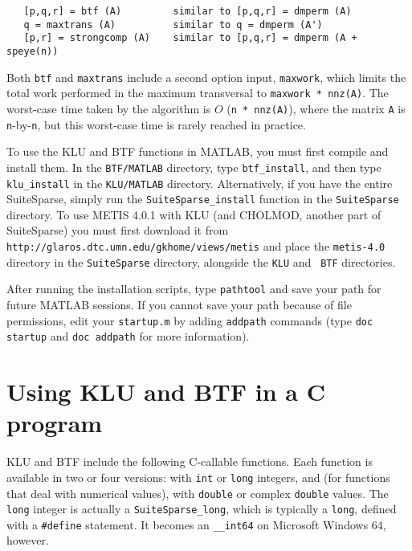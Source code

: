 \documentclass[11pt]{article}
\begin{document}
{\footnotesize
\begin{verbatim}
   [p,q,r] = btf (A)         similar to [p,q,r] = dmperm (A)
   q = maxtrans (A)          similar to q = dmperm (A')
   [p,r] = strongcomp (A)    similar to [p,q,r] = dmperm (A + speye(n))
\end{verbatim}
}

Both {\tt btf} and {\tt maxtrans} include a second option input, {\tt maxwork},
which limits the total work performed in the maximum transversal to
{\tt maxwork * nnz(A)}.  The worst-case time taken by the algorithm is
$O$ ({\tt n * nnz(A)}), where the matrix {\tt A} is {\tt n}-by-{\tt n}, but
this worst-case time is rarely reached in practice.

To use the KLU and BTF functions in MATLAB, you must first compile and install
them.  In the {\tt BTF/MATLAB} directory, type {\tt btf\_install}, and then
type {\tt klu\_install} in the {\tt KLU/MATLAB} directory.  Alternatively, if
you have the entire SuiteSparse, simply run the {\tt SuiteSparse\_install}
function in the {\tt SuiteSparse} directory.   To use METIS 4.0.1 with KLU (and
CHOLMOD, another part of SuiteSparse) you must first download it from {\tt
http://glaros.dtc.umn.edu/gkhome/views/metis} and place the {\tt metis-4.0}
directory in the {\tt SuiteSparse} directory, alongside the {\tt KLU} and {\tt
BTF} directories.

After running the installation scripts, type {\tt pathtool} and save your path
for future MATLAB sessions.  If you cannot save your path because of file
permissions, edit your {\tt startup.m} by adding {\tt addpath} commands (type
{\tt doc startup} and {\tt doc addpath} for more information).

\section{Using KLU and BTF in a C program}
\label{Cversion}

KLU and BTF include the following C-callable functions.  Each function is
available in two or four versions: with {\tt int} or {\tt long} integers, and
(for functions that deal with numerical values), with {\tt double} or complex
{\tt double} values.  The {\tt long} integer is actually a {\tt SuiteSparse\_long},
which is typically a {\tt long}, defined with a {\tt \#define} statement.  It
becomes an {\tt \_\_int64} on Microsoft Windows 64, however.
\end{document}
